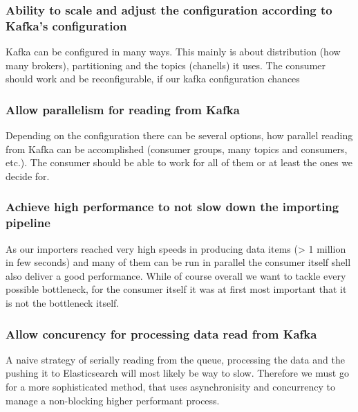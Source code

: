 \subsubsection{Ability to scale and adjust the configuration according
to Kafka's
configuration}\label{ability-to-scale-and-adjust-the-configuration-according-to-kafkas-configuration}

Kafka can be configured in many ways. This mainly is about distribution
(how many brokers), partitioning and the topics (chanells) it uses. The
consumer should work and be reconfigurable, if our kafka configuration
chances

\subsubsection{Allow parallelism for reading from
Kafka}\label{allow-parallelism-for-reading-from-kafka}

Depending on the configuration there can be several options, how
parallel reading from Kafka can be accomplished (consumer groups, many
topics and consumers, etc.). The consumer should be able to work for all
of them or at least the ones we decide for.

\subsubsection{Achieve high performance to not slow down the importing
pipeline}\label{achieve-high-performance-to-not-slow-down-the-importing-pipeline}

As our importers reached very high speeds in producing data items
(\textgreater{} 1 million in few seconds) and many of them can be run in
parallel the consumer itself shell also deliver a good performance.
While of course overall we want to tackle every possible bottleneck, for
the consumer itself it was at first most important that it is not the
bottleneck itself.

\subsubsection{Allow concurency for processing data read from
Kafka}\label{allow-concurency-for-processing-data-read-from-kafka}

A naive strategy of serially reading from the queue, processing the data
and the pushing it to Elasticsearch will most likely be way to slow.
Therefore we must go for a more sophisticated method, that uses
asynchronisity and concurrency to manage a non-blocking higher
performant process.

